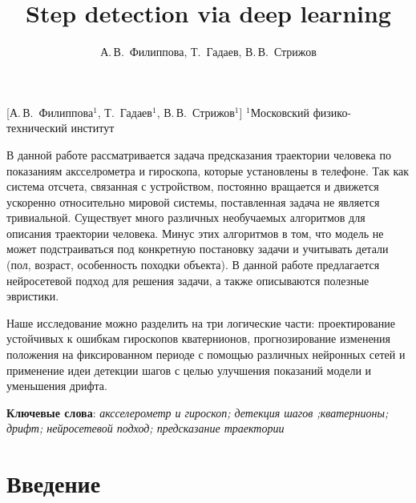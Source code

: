 \documentclass[12pt, twoside]{article}
\begin{document}
\title
    [Step detection via deep learning] %
    {Step detection via deep learning}
\author
    [А.\,В.~Филиппова] %
    {А.\,В.~Филиппова, Т.~Гадаев, В.\,В.~Стрижов} %
    [А.\,В.~Филиппова$^1$, Т.~Гадаев$^1$, В.\,В.~Стрижов$^{1}$] %
\organization
    {$^1$Московский физико-технический институт}
\abstract
    {В данной работе рассматривается задача предсказания траектории человека по показаниям аксселрометра и гироскопа, которые установлены в телефоне. Так как система отсчета, связанная с устройством, постоянно вращается и движется ускоренно относительно мировой системы, поставленная задача не является тривиальной. Существует много различных необучаемых алгоритмов для описания траектории человека. Минус этих алгоритмов в том, что модель не может подстраиваться под конкретную постановку задачи и учитывать детали (пол, возраст, особенность походки объекта). В данной работе предлагается нейросетевой подход для решения задачи, а также описываются полезные эвристики. 
    
    Наше исследование можно разделить на три логические части: проектирование устойчивых к ошибкам гироскопов кватернионов, прогнозирование изменения положения на фиксированном периоде с помощью различных нейронных сетей и применение идеи детекции шагов с целью улучшения показаний модели и уменьшения дрифта.
\bigskip
\noindent


\textbf{Ключевые слова}: \emph {аксселерометр и гироскоп; детекция шагов ;кватернионы; дрифт; нейросетевой подход; предсказание траектории}
}

\maketitle
\linenumbers

\section{Введение}
\end{document}
